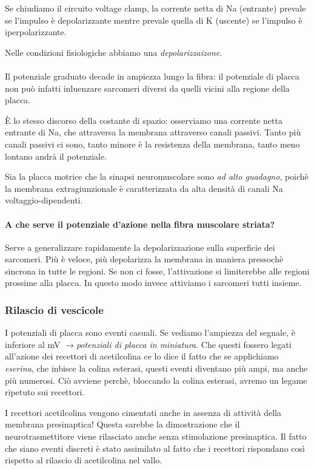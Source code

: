 \documentclass[a4paper,12pt]{article}
\newcommand{\lfreccia}{\ensuremath{\longrightarrow}}
\begin{document}
Se chiudiamo il circuito voltage clamp, la corrente netta di Na (entrante) prevale se l'impulso è depolarizzante mentre prevale quella di K (uscente) se l'impulso è iperpolarizzante.

Nelle condizioni fisiologiche abbiamo una \emph{depolarizzaizone}.

\paragraph{}
Il potenziale graduato decade in ampiezza lungo la fibra: il potenziale di placca non può infatti inluenzare sarcomeri diversi da quelli vicini alla regione della placca.

È lo stesso discorso della costante di spazio: osserviamo una corrente netta entrante di Na, che attraversa la membrana attraverso canali passivi. Tanto più canali passivi ci sono, tanto minore è la resistenza della membrana, tanto meno lontano andrà il potenziale.

Sia la placca motrice che la sinapsi neuromuscolare sono \emph{ad alto guadagno}, poichè la membrana extragiunzionale è caratterizzata da alta densità di canali Na voltaggio-dipendenti.

\paragraph{A che serve il potenziale d'azione nella fibra muscolare striata?}
Serve a generalizzare rapidamente la depolarizzazione sulla superficie dei sarcomeri. Più è veloce, più depolarizza la membrana in maniera pressochè sincrona in tutte le regioni. Se non ci fosse, l'attivazione si limiterebbe alle regioni prossime alla placca. In questo modo invece attiviamo i sarcomeri tutti insieme.

\subsubsection{Rilascio di vescicole}

I potenziali di placca sono eventi casuali. Se vediamo l'ampiezza del segnale, è inferiore al mV \lfreccia \emph{potenziali di placca in miniatura}. Che questi fossero legati all'azione dei recettori di acetilcolina ce lo dice il fatto che se applichiamo \emph{eserina}, che inbisce la colina esterasi, questi eventi diventano più ampi, ma anche più numerosi. Ciò avviene perchè, bloccando la colina esterasi, avremo un legame ripetuto sui recettori.

I recettori acetilcolina vengono cimentati anche in assenza di attività della membrana presinaptica! Questa sarebbe la dimostrazione che il neurotrasmettitore viene rilasciato anche senza stimolazione presinaptica. Il fatto che siano eventi discreti è stato assimilato al fatto che i recettori rispondano così rispetto al rilascio di acetilcolina nel vallo.
\end{document}
